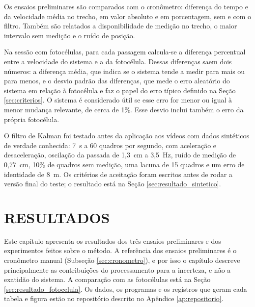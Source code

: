 \documentclass[
    12pt,               %
    openright,          %
    twoside,            %
    a4paper,            %
    chapter=TITLE,      %
    english,            %
    brazil              %
    ]{abntex2}
\begin{document}
Os ensaios preliminares são comparados com o cronômetro: diferença do tempo e da velocidade média no trecho, em valor absoluto e em porcentagem, sem e com o filtro. Também são relatados a disponibilidade de medição no trecho, o maior intervalo sem medição e o ruído de posição.

Na sessão com fotocélulas, para cada passagem calcula-se a diferença percentual entre a velocidade do sistema e a da fotocélula. Dessas diferenças saem dois números: a diferença média, que indica se o sistema tende a medir para mais ou para menos, e o desvio padrão das diferenças, que mede o erro aleatório do sistema em relação à fotocélula e faz o papel do erro típico definido na Seção \ref{sec:criterios}. O sistema é considerado útil se esse erro for menor ou igual à menor mudança relevante, de cerca de 1\%. Esse desvio inclui também o erro da própria fotocélula.

O filtro de Kalman foi testado antes da aplicação aos vídeos com dados sintéticos de verdade conhecida: 7~s a 60 quadros por segundo, com aceleração e desaceleração, oscilação da passada de 1,3~cm a 3,5~Hz, ruído de medição de 0,77~cm, 10\% de quadros sem medição, uma lacuna de 15 quadros e um erro de identidade de 8~m. Os critérios de aceitação foram escritos antes de rodar a versão final do teste; o resultado está na Seção \ref{sec:resultado_sintetico}.

\chapter{RESULTADOS}

Este capítulo apresenta os resultados dos três ensaios preliminares e dos experimentos feitos sobre o método. A referência dos ensaios preliminares é o cronômetro manual (Subseção \ref{sec:cronometro}), e por isso o capítulo descreve principalmente as contribuições do processamento para a incerteza, e não a exatidão do sistema. A comparação com as fotocélulas está na Seção \ref{sec:resultado_fotocelula}. Os dados, os programas e os registros que geram cada tabela e figura estão no repositório descrito no Apêndice \ref{ap:repositorio}.

\end{document}
